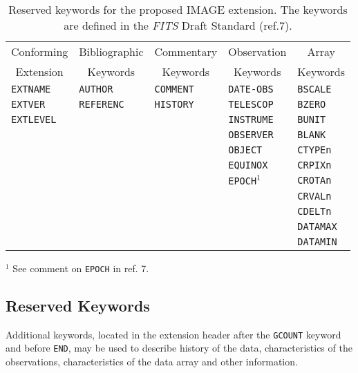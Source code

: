 {\small
\begin{table}[htpb]
\begin{center}
\begin{tabular}{lllll} \\ 
\multicolumn{1}{c}{Conforming} & \multicolumn{1}{c}{Bibliographic} & 
\multicolumn{1}{c}{Commentary} & \multicolumn{1}{c}{Observation}   & 
\multicolumn{1}{c}{Array} \\ 
\multicolumn{1}{c}{Extension} & \multicolumn{1}{c}{Keywords} & 
\multicolumn{1}{c}{Keywords}  & \multicolumn{1}{c}{Keywords}   & 
\multicolumn{1}{c}{Keywords} \\ \hline
{\tt EXTNAME} &{\tt AUTHOR}  & {\tt COMMENT}  &{\tt DATE-OBS}&{\tt BSCALE} \\
{\tt EXTVER}  &{\tt REFERENC}& {\tt HISTORY}  &{\tt TELESCOP}&{\tt BZERO}  \\
{\tt EXTLEVEL}&              &\verb*+        +&{\tt INSTRUME}&{\tt BUNIT}  \\
              &              &                &{\tt OBSERVER}&{\tt BLANK}  \\
              &              &                &{\tt OBJECT}  &{\tt CTYPEn} \\
              &              &                &{\tt EQUINOX} &{\tt CRPIXn} \\
              &              &                &{\tt EPOCH}$^{1}$&{\tt CROTAn} \\
              &              &                &              &{\tt CRVALn} \\
              &              &                &              &{\tt CDELTn} \\
              &              &                &              &{\tt DATAMAX}\\
              &              &                &              &{\tt DATAMIN}\\
\hline
\end{tabular}
\end{center}
$^1$  See comment on {\tt EPOCH} in ref. 7.

\caption[Reserved IMAGE extension keywords]
         {Reserved keywords for the proposed IMAGE extension.
          The keywords are defined in the {\em FITS} Draft Standard (ref.7).}
\end{table}
}

\newpage

\subsection{Reserved Keywords}
Additional keywords, located in the extension header after 
the {\tt GCOUNT} keyword and before {\tt END},
may be used to describe history of the data, 
characteristics of the observations, characteristics of the data array
and other information.

